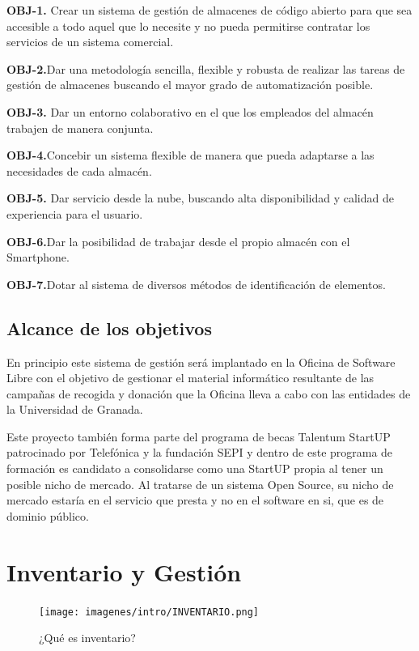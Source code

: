 \documentclass[a4paper,11pt]{book}
\begin{document}
\textbf{OBJ-1.} Crear un sistema de gestión de almacenes de código abierto para que sea accesible  a todo aquel que lo necesite y no pueda permitirse contratar los servicios de un sistema comercial. 

\textbf{OBJ-2.}Dar una metodología sencilla, flexible y robusta de realizar las tareas de gestión de almacenes buscando el mayor grado de automatización posible. 

\textbf{OBJ-3.} Dar un entorno colaborativo en el que los empleados del almacén trabajen de manera conjunta.

\textbf{OBJ-4.}Concebir un sistema flexible de manera que pueda adaptarse a las necesidades de cada almacén.

\textbf{OBJ-5.} Dar servicio desde la nube, buscando alta disponibilidad y calidad de experiencia para el usuario.  

\textbf{OBJ-6.}Dar la posibilidad de trabajar desde el propio almacén con el Smartphone. 

\textbf{OBJ-7.}Dotar al sistema de diversos métodos de identificación de elementos. 

\subsection{Alcance de los objetivos}

En principio este sistema de gestión será implantado en la Oficina de Software Libre con el objetivo de gestionar el material informático resultante de las campañas de recogida y donación que la Oficina lleva a cabo con las entidades de la Universidad de Granada. 

Este proyecto también forma parte del programa de becas Talentum StartUP patrocinado por Telefónica y la fundación SEPI y dentro de este programa de formación es candidato a consolidarse como una StartUP propia al tener un posible nicho de mercado. Al tratarse de un sistema Open Source, su nicho de mercado estaría en el servicio que presta y no en el software en si, que es de dominio público. 

 

\section{Inventario y Gestión}
\begin{figure}[H]  
\centering 
\texttt{[image: imagenes/intro/INVENTARIO.png]}
\caption{ ¿Qué es inventario?\cite{cuestion} }  
\end{figure} 
\end{document}
